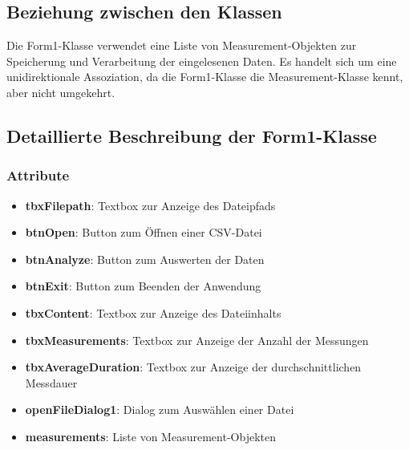 \documentclass[a4paper,11pt]{article}
\begin{document}
\subsection{Beziehung zwischen den Klassen}
Die Form1-Klasse verwendet eine Liste von Measurement-Objekten zur Speicherung und Verarbeitung der eingelesenen Daten. Es handelt sich um eine unidirektionale Assoziation, da die Form1-Klasse die Measurement-Klasse kennt, aber nicht umgekehrt.

\subsection{Detaillierte Beschreibung der Form1-Klasse}

\subsubsection{Attribute}
\begin{itemize}
    \item \textbf{tbxFilepath}: Textbox zur Anzeige des Dateipfads
    \item \textbf{btnOpen}: Button zum Öffnen einer CSV-Datei
    \item \textbf{btnAnalyze}: Button zum Auswerten der Daten
    \item \textbf{btnExit}: Button zum Beenden der Anwendung
    \item \textbf{tbxContent}: Textbox zur Anzeige des Dateiinhalts
    \item \textbf{tbxMeasurements}: Textbox zur Anzeige der Anzahl der Messungen
    \item \textbf{tbxAverageDuration}: Textbox zur Anzeige der durchschnittlichen Messdauer
    \item \textbf{openFileDialog1}: Dialog zum Auswählen einer Datei
    \item \textbf{measurements}: Liste von Measurement-Objekten
\end{itemize}
\end{document}
